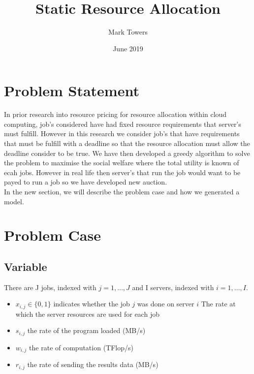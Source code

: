 \documentclass[fleqn]{article}
\title{Static Resource Allocation}
\author{Mark Towers}
\date{June 2019}
\begin{document}
\maketitle

\section{Problem Statement}\label{sec:problem-statement}
In prior research into resource pricing for resource allocation within cloud computing, job's considered have had fixed resource requirements that server's must fulfill.
However in this research we consider job's that have requirements that must be fulfill with a deadline so that the resource allocation must allow the deadline consider to be true.
We have then developed a greedy algorithm to solve the problem to maximise the social welfare where the total utility is known of ecah jobs.
However in real life then server's that run the job would want to be payed to run a job so we have developed new auction. \\
In the new section, we will describe the problem case and how we generated a model. \\

\section{Problem Case}\label{sec:problem-case}
\subsection{Variable}\label{subsec:variable}
There are J jobs, indexed with $ j = 1,\dots,J $ and I servers, indexed with $ i = 1,\dots,I $.
\begin{itemize}
    \item $ x_{i,j} \in \{0, 1\}$ indicates whether the job $j$ was done on server $i$
    The rate at which the server resources are used for each job
    \item $ s_{i,j} $ the rate of the program loaded (MB/s)
    \item $ w_{i,j} $ the rate of computation (TFlop/s)
    \item $ r_{i,j} $ the rate of sending the results data (MB/s)
\end{itemize}
\end{document}
